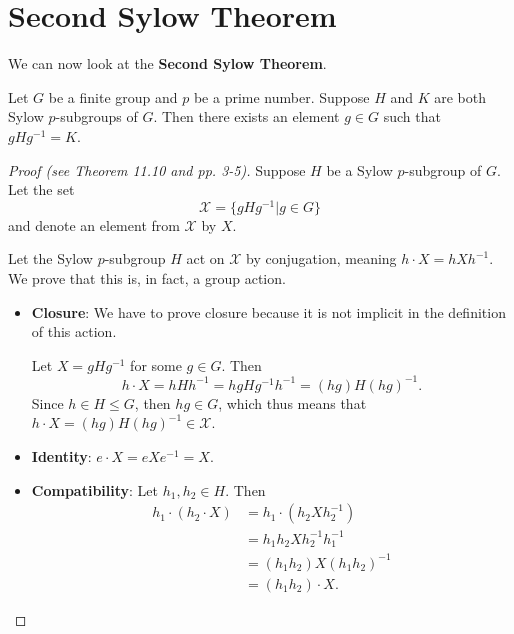 \section{Second Sylow Theorem}
We can now look at the \textbf{Second Sylow Theorem}.
\begin{theorem}[Sylow II]\label{thrm-sylow-2}
    Let $G$ be a finite group and $p$ be a prime number. Suppose $H$ and $K$ are both Sylow $p$-subgroups of $G$. Then there exists an element $g \in G$ such that $gHg^{-1} = K$.
\end{theorem}
\begin{proof}[Proof (see \cite{humphreys_1996} Theorem 11.10 and \cite{mann_2011} pp. 3-5)]
    Suppose $H$ be a Sylow $p$-subgroup of $G$. Let the set
    \[
        \mathcal{X} = \{gHg^{-1} \vert g \in G\}
    \]
    and denote an element from $\mathcal{X}$ by $X$.

    Let the Sylow $p$-subgroup $H$ act on $\mathcal{X}$ by conjugation, meaning $h \cdot X = hXh^{-1}$. We prove that this is, in fact, a group action.
    
    \begin{itemize}
        \item \textbf{Closure}: We have to prove closure because it is not implicit in the definition of this action.

        Let $X = gHg^{-1}$ for some $g \in G$. Then
        \[
            h\cdot X = hHh^{-1} = hgHg^{-1}h^{-1} = (hg)H(hg)^{-1}.
        \]
        Since $h \in H \leq G$, then $hg \in G$, which thus means that $h \cdot X = (hg)H(hg)^{-1} \in \mathcal{X}$.
        \item \textbf{Identity}: $e \cdot X = eXe^{-1} = X$.
        \item \textbf{Compatibility}: Let $h_1, h_2 \in H$. Then
        \begin{align*}
            h_1 \cdot (h_2 \cdot X) &= h_1 \cdot (h_2Xh_2^{-1})\\
            &= h_1h_2Xh_2^{-1}h_1^{-1}\\
            &= (h_1h_2)X(h_1h_2)^{-1}\\
            &= (h_1h_2) \cdot X.
        \end{align*}
    \end{itemize}

    


\end{proof}
